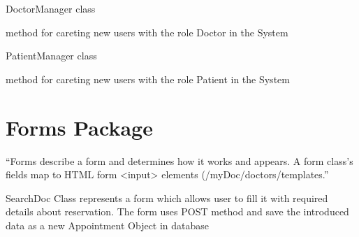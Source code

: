 \documentclass[letterpaper,10pt,english]{sphinxmanual}
\begin{document}
\begin{fulllineitems}
\label{managers:doctors.managers.DoctorManager}
DoctorManager class

\begin{fulllineitems}
\label{managers:doctors.managers.DoctorManager.create_patient}
method for careting new users with the role Doctor in the System

\end{fulllineitems}


\end{fulllineitems}


\begin{fulllineitems}
\label{managers:doctors.managers.PatientManager}
PatientManager class

\begin{fulllineitems}
\label{managers:doctors.managers.PatientManager.create_patient}
method for careting new users with the role Patient in the System

\end{fulllineitems}


\end{fulllineitems}



\chapter{Forms Package}
\label{forms:forms-package}\label{forms::doc}
``Forms describe a form and determines how it works and appears. A form class’s fields map to HTML form \textless{}input\textgreater{} elements (/myDoc/doctors/templates.''
\label{forms:module-doctors.forms}

\begin{fulllineitems}
\label{forms:doctors.forms.BookDoc}
SearchDoc Class represents a form which allows user to fill it with required details about reservation. The form uses POST method and save the introduced data as a new Appointment Object in database

\end{fulllineitems}
\end{document}
